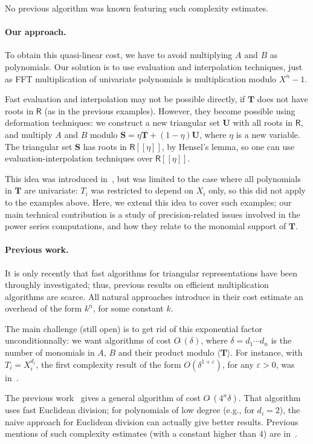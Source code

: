 \documentclass[amsthm]{elsart}
\def\S {\ensuremath{\mathbf{S}}}
\def\T {\ensuremath{\mathbf{T}}}
\def\U {\ensuremath{\mathbf{U}}}
\def\rng {\ensuremath{\mathsf{R}}}
\theoremstyle{plain}
\begin{document}
\smallskip\noindent
No previous algorithm was known featuring such complexity estimates.

\paragraph*{Our approach.}
To obtain this quasi-linear cost, we have to avoid multiplying $A$ and
$B$ as polynomials. Our solution is to use evaluation and
interpolation techniques, just as FFT multiplication of univariate
polynomials is multiplication modulo $X^n-1$.

Fast evaluation and interpolation may not be possible directly, if
$\T$ does not have roots in $\rng$ (as in the previous
examples). However, they become possible using deformation techniques:
we construct a new triangular set $\U$ with all roots in $\rng$, and
multiply $A$ and $B$ modulo $\S=\eta \T + (1-\eta) \U$, where $\eta$
is a new variable. The triangular set $\S$ has roots in
$\rng[[\eta]]$, by Hensel's lemma, so one can use evaluation-interpolation
techniques over $\rng[[\eta]]$.

This idea was introduced in~\cite{LiMoSc07}, but was limited to the
case where all polynomials in $\T$ are univariate: $T_i$ was
restricted to depend on $X_i$ only, so this did not apply to the
examples above. Here, we extend this idea to cover such examples; our
main technical contribution is a study of precision-related issues
involved in the power series computations, and how they relate to the
monomial support of $\T$.

\paragraph*{Previous work.} It is only recently that fast algorithms
for triangular representations have been throughly investigated; thus,
previous results on efficient multiplication algorithms are scarce.
All natural approaches introduce in their cost estimate an overhead of
the form $k^n$, for some constant $k$. 

The main challenge (still open) is to get rid of this exponential
factor unconditionnally: we want algorithms of cost
$O\tilde{~}(\delta)$, where $\delta=d_1\cdots d_n$ is the number of
monomials in $A$, $B$ and their product modulo $\langle \T \rangle$.
For instance, with $T_i=X_i^{d_i}$, the first complexity result of the form
$O(\delta^{1+\varepsilon})$, for any $\varepsilon > 0$, was in~\cite{Schost05}.

The previous work~\cite{LiMoSc07} gives a general algorithm of cost
$O\tilde{~}(4^n\delta)$. That algorithm uses fast Euclidean division;
for polynomials of low degree (e.g., for $d_i=2$), the naive approach
for Euclidean division can actually give better results.  Previous
mentions of such complexity estimates (with a constant higher than
$4$) are in~\cite{Langemyr91}.
\end{document}
